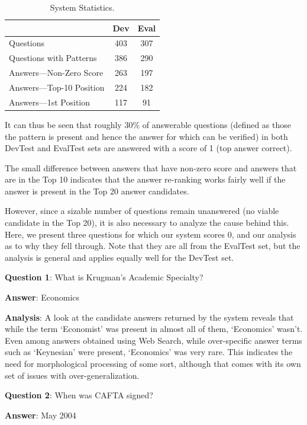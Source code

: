 \documentclass[11pt]{article}
\begin{document}
\begin{table}[h]
\begin{center}
\begin{tabular}{ |l |c |c| }
\hline
& Dev & Eval\\
\hline
Questions & 403 & 307\\
Questions with Patterns & 386 & 290\\
Answers---Non-Zero Score & 263 & 197\\
Answers---Top-10 Position & 224 & 182\\
Answers---1st Position & 117 & 91\\
\hline
\end{tabular}
\end{center}
\caption{\label{stats} System Statistics. 
}
\end{table}
It can thus be seen that roughly 30\% of answerable questions (defined as those the pattern is present and hence the answer for which can be verified) in both DevTest and EvalTest sets are answered with a score of 1 (top answer correct).

The small difference between answers that have non-zero score and answers that are in the Top 10 indicates that the answer re-ranking works fairly well if the answer is present in the Top 20 answer candidates. 

However, since a sizable number of questions remain unanswered (no viable candidate in the Top 20), it is also necessary to analyze the cause behind this.  Here, we present three questions for which our system scores 0, and our analysis as to why they fell through. Note that they are all from the EvalTest set, but the analysis is general and applies equally well for the DevTest set.


\noindent \textbf{Question 1}: What is Krugman's Academic Specialty? 

\noindent \textbf{Answer}: Economics

\noindent \textbf{Analysis}: A look at the candidate answers returned by the system reveals that while the term `Economist' was present in almost all of them, `Economics' wasn't. Even among answers obtained using Web Search, while over-specific answer terms such as `Keynesian' were present, `Economics' was very rare. This indicates the need for morphological processing of some sort, although that comes with its own set of issues with over-generalization.

\noindent \textbf{Question 2}: When was CAFTA signed? 

\noindent \textbf{Answer}: May 2004
\end{document}
